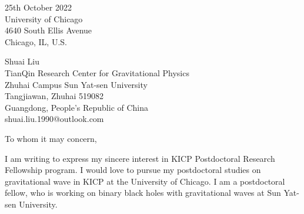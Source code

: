 \documentclass[11pt,a4paper,sans]{letter} %
\date{}
\begin{document}

\begin{letter}{25th October 2022 \\
University of Chicago\\
4640 South Ellis Avenue\\ 
Chicago, IL, U.S.}

Shuai Liu \\
TianQin Research Center for Gravitational Physics \\
Zhuhai Campus Sun Yat-sen University \\
Tangjiawan, Zhuhai 519082 \\
Guangdong, People's Republic of China \\
shuai.liu.1990@outlook.com








\opening{To whom it may concern,} 
 
    I am writing to express my sincere interest in KICP Postdoctoral Research Fellowship program. I would love to
pursue my postdoctoral studies on gravitational wave in KICP at the University of Chicago. I am a postdoctoral fellow, who is working on 
    binary black holes with
    gravitational waves at Sun Yat-sen University.


\end{letter}
\end{document}
